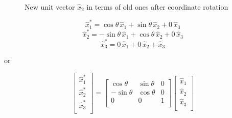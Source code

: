 \begin{figure}[h]
\begin{center}
\end{center}
\caption{New unit vector $\hat{x}_2$ in terms of old ones after coordinate rotation}
\label{rotationofaxes4}
\end{figure}


$$ \hat{x}^*_1 = \cos\theta \, \hat{x}_1 + \sin\theta \, \hat{x}_2 + 0 \, \hat{x}_3 $$ 
$$ \hat{x}^*_2 = -\sin\theta \, \hat{x}_1 + \cos\theta \, \hat{x}_2 + 0 \, \hat{x}_3 $$ 
$$ \hat{x}^*_3 = 0 \, \hat{x}_1 + 0 \, \hat{x}_2 + \hat{x}_3 $$ 

or

\begin{equation*}
\left[ 
\begin{array}{l}
\hat{x}_1^*  \\
\hat{x}_2^* \\
\hat{x}_3^*  \\
\end{array}
\right] 
= \left[ 
\begin{array}{lll}
 \cos\theta  &  \sin\theta  & 0\\
 -\sin\theta &  \cos\theta  & 0 \\
  0 & 0 & 1\\
\end{array}
\right] 
\left[ 
\begin{array}{l}
\hat{x}_1 \\
\hat{x}_2 \\
\hat{x}_3 \\
\end{array}
\right]
\end{equation*}

